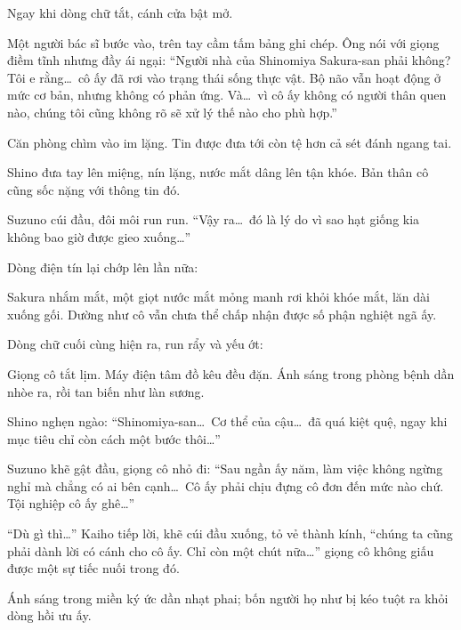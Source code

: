 \documentclass[../main.tex]{subfiles}
\begin{document}

Ngay khi dòng chữ tắt, cánh cửa bật mở.

Một người bác sĩ bước vào, trên tay cầm tấm bảng ghi chép. Ông nói với giọng điềm tĩnh nhưng đầy ái ngại: ``Người nhà của Shinomiya Sakura-san phải không? Tôi e rằng\dots\ cô ấy đã rơi vào trạng thái sống thực vật. Bộ não vẫn hoạt động ở mức cơ bản, nhưng không có phản ứng. Và\dots\ vì cô ấy không có người thân quen nào, chúng tôi cũng không rõ sẽ xử lý thế nào cho phù hợp.''

Căn phòng chìm vào im lặng. Tin được đưa tới còn tệ hơn cả sét đánh ngang tai.

Shino đưa tay lên miệng, nín lặng, nước mắt dâng lên tận khóe. Bản thân cô cũng sốc nặng với thông tin đó.

Suzuno cúi đầu, đôi môi run run. ``Vậy ra\dots\ đó là lý do vì sao hạt giống kia không bao giờ được gieo xuống\dots''

Dòng điện tín lại chớp lên lần nữa:


Sakura nhắm mắt, một giọt nước mắt mỏng manh rơi khỏi khóe mắt, lăn dài xuống gối. Dường như cô vẫn chưa thể chấp nhận được số phận nghiệt ngã ấy.

Dòng chữ cuối cùng hiện ra, run rẩy và yếu ớt:


Giọng cô tắt lịm. Máy điện tâm đồ kêu đều đặn. Ánh sáng trong phòng bệnh dần nhòe ra, rồi tan biến như làn sương.


Shino nghẹn ngào: ``Shinomiya-san\dots\ Cơ thể của cậu\dots\ đã quá kiệt quệ, ngay khi mục tiêu chỉ còn cách một bước thôi\dots''

Suzuno khẽ gật đầu, giọng cô nhỏ đi: ``Sau ngần ấy năm, làm việc không ngừng nghỉ mà chẳng có ai bên cạnh\dots\ Cô ấy phải chịu đựng cô đơn đến mức nào chứ. Tội nghiệp cô ấy ghê\dots''

``Dù gì thì\dots'' Kaiho tiếp lời, khẽ cúi đầu xuống, tỏ vẻ thành kính, ``chúng ta cũng phải dành lời có cánh cho cô ấy. Chỉ còn một chút nữa\dots'' giọng cô không giấu được một sự tiếc nuối trong đó.

Ánh sáng trong miền ký ức dần nhạt phai; bốn người họ như bị kéo tuột ra khỏi dòng hồi ưu ấy.
\end{document}
